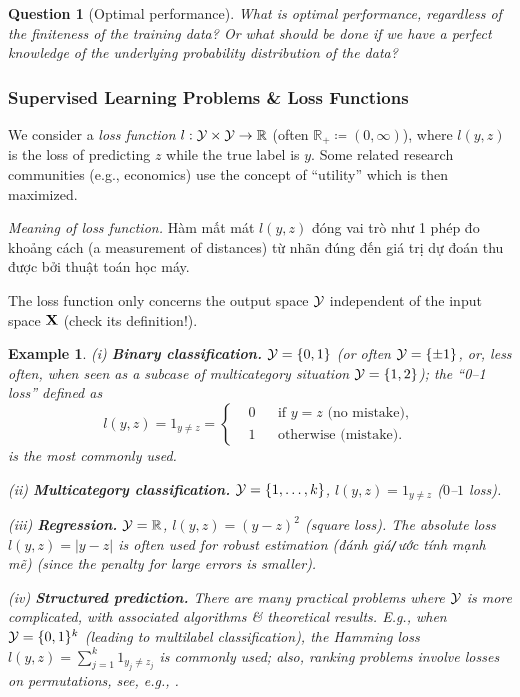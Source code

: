 \documentclass{article}
\newtheorem{example}{Example}
\newtheorem{question}{Question}
\begin{document}
\begin{question}[Optimal performance]
	What is optimal performance, regardless of the finiteness of the training data? Or what should be done if we have a perfect knowledge of the underlying probability distribution of the data?
\end{question}


\subsubsection{Supervised Learning Problems \& Loss Functions}
We consider a {\it loss function} $l:{\cal Y}\times{\cal Y}\to\mathbb{R}$ (often $\mathbb{R}_+\coloneqq(0,\infty)$), where $l(y,z)$ is the loss of predicting $z$ while the true label is $y$. Some related research communities (e.g., economics) use the concept of ``utility'' which is then maximized.

{\it Meaning of loss function.} Hàm mất mát $l(y,z)$ đóng vai trò như 1 phép đo khoảng cách (a measurement of distances) từ nhãn đúng đến giá trị dự đoán thu được bởi thuật toán học máy.

The loss function only concerns the output space ${\cal Y}$ independent of the input space ${\bf X}$ (check its definition!).
\begin{example}
	\item(i) {\bf Binary classification.} ${\cal Y} = \{0,1\}$ (or often ${\cal Y} = \{\pm1\}$, or, less often, when seen as a subcase of multicategory situation ${\cal Y} = \{1,2\}$); the ``0--1 loss'' defined as
	\begin{equation*}
		l(y,z) = 1_{y\ne z} = \left\{\begin{split}
			&0&&\mbox{if } y = z\mbox{ (no mistake)},\\
			&1&&\mbox{otherwise (mistake)}.
		\end{split}\right.
	\end{equation*}
	is the most commonly used.
	\item(ii) {\bf Multicategory classification.} ${\cal Y} = \{1,\ldots,k\}$, $l(y,z) = 1_{y\ne z}$ ($0$--$1$ loss).
	\item(iii) {\bf Regression.} ${\cal Y} = \mathbb{R}$, $l(y,z) = (y - z)^2$ (square loss). The absolute loss $l(y,z) = |y - z|$ is often used for robust estimation (đánh giá{\tt/}ước tính mạnh mẽ) (since the penalty for large errors is smaller).
	\item(iv) {\bf Structured prediction.} There are many practical problems where ${\cal Y}$ is more complicated, with associated algorithms \& theoretical results. E.g., when ${\cal Y} = \{0,1\}^k$ (leading to \emph{multilabel classification}), the \emph{Hamming loss} $l(y,z) = \sum_{j=1}^k 1_{y_j\ne z_j}$ is commonly used; also, ranking problems involve losses on permutations, see, e.g., \cite[Chap. 13: Structured Prediction]{Bach2024}.
\end{example}
\end{document}
